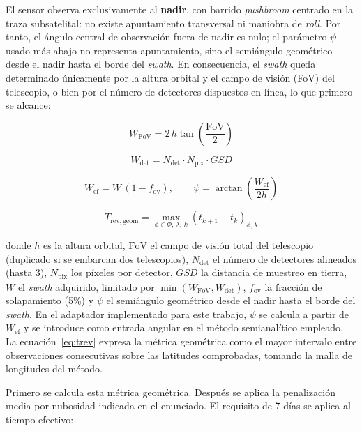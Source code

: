 El sensor observa exclusivamente al \textbf{nadir}, con barrido \textit{pushbroom} centrado en la traza subsatelital: no existe apuntamiento transversal ni maniobra de \textit{roll}. Por tanto, el ángulo central de observación fuera de nadir es nulo; el parámetro \(\psi\) usado más abajo no representa apuntamiento, sino el semiángulo geométrico desde el nadir hasta el borde del \textit{swath}. En consecuencia, el \textit{swath} queda determinado únicamente por la altura orbital y el campo de visión (FoV) del telescopio, o bien por el número de detectores dispuestos en línea, lo que primero se alcance:

\begin{equation}
W_{\text{FoV}} = 2\,h \tan\!\left(\frac{\text{FoV}}{2}\right)
\label{eq:swath_fov}
\end{equation}

\begin{equation}
W_{\text{det}} = N_{\text{det}} \cdot N_{\text{pix}} \cdot GSD
\label{eq:swath_det}
\end{equation}

\begin{equation}
W_{\text{ef}} = W\,(1-f_{\text{ov}}), \qquad
\psi = \arctan\!\left(\frac{W_{\text{ef}}}{2h}\right)
\label{eq:swath_ef}
\end{equation}

\begin{equation}
T_{\mathrm{rev,geom}} = \max_{\phi\in\Phi,\,\lambda,\,k}\left(t_{k+1}-t_{k}\right)_{\phi,\lambda}
\label{eq:trev}
\end{equation}

donde $h$ es la altura orbital, $\text{FoV}$ el campo de visión total del telescopio (duplicado si se embarcan dos telescopios), $N_{\text{det}}$ el número de detectores alineados (hasta 3), $N_{\text{pix}}$ los píxeles por detector, $GSD$ la distancia de muestreo en tierra, $W$ el \textit{swath} adquirido, limitado por $\min(W_{\text{FoV}},W_{\text{det}})$, $f_{\text{ov}}$ la fracción de solapamiento (5\%) y $\psi$ el semiángulo geométrico desde el nadir hasta el borde del \textit{swath}. En el adaptador implementado para este trabajo, $\psi$ se calcula a partir de $W_{\text{ef}}$ y se introduce como entrada angular en el método semianalítico empleado. La ecuación~\eqref{eq:trev} expresa la métrica geométrica como el mayor intervalo entre observaciones consecutivas sobre las latitudes comprobadas, tomando la malla de longitudes del método.

Primero se calcula esta métrica geométrica. Después se aplica la penalización media por nubosidad indicada en el enunciado. El requisito de 7 días se aplica al tiempo efectivo:

